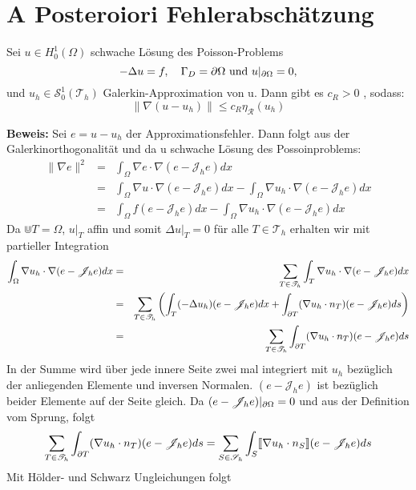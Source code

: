 \section{A Posteroiori Fehlerabschätzung}
\begin{theorem}
	Sei $u\in H^1_0(\Omega)$ schwache Lösung des Poisson-Problems \[-\Delta u = f ,\quad \Gamma_D = \partial \Omega \text{ und } u|_{\partial \Omega} = 0, \] und $u_h \in \mathscr{S}^1_0(\mathscr{T}_h)$ Galerkin-Approximation von u. Dann gibt es $c_R > 0$ , sodass:
	\[\|\nabla(u-u_h)\|\leq c_R\eta_\mathscr{R}(u_h)
	\]
\end{theorem}
\textbf{Beweis:}
Sei $e = u-u_h$ der Approximationsfehler. Dann folgt aus der Galerkinorthogonalität und da u schwache Lösung des Possoinproblems:
\begin{eqnarray*}
	\|\nabla e\|^2 &=& \int_{\Omega}\nabla e \cdot \nabla (e-\mathscr{J}_he)dx \\
	&=&\int_{\Omega} \nabla u \cdot \nabla (e-\mathscr{J}_he)dx -\int_{\Omega} \nabla u_h \cdot \nabla (e-\mathscr{J}_he)dx \\
	&=&\int_{\Omega} f (e-\mathscr{J}_he)dx -\int_{\Omega} \nabla u_h \cdot \nabla (e-\mathscr{J}_he)dx
\end{eqnarray*}
Da $\Cup T = \Omega$,  $u|_T$ affin und somit $\Delta u|_T=0$ für alle $T\in\mathscr{T}_h$ erhalten wir mit partieller Integration
\begin{eqnarray*}
	\int_{\Omega}\nabla u_h\cdot\nabla (e-\mathscr{J}_he) dx &=& \sum_{T\in\mathscr{T}_h} \int_{T} \nabla u_h \cdot \nabla (e-\mathscr{J}_he) dx \\
	&=& \sum_{T\in\mathscr{T}_h} \left(\int_{T} (-\Delta u_h) (e-\mathscr{J}_he) dx +\int_{\partial T} (\nabla u_h \cdot n_T) (e-\mathscr{J}_he) ds\right) \\
	&=&\sum_{T\in\mathscr{T}_h} \int_{\partial T} (\nabla u_h \cdot n_T) (e-\mathscr{J}_he) ds
\end{eqnarray*}
In der Summe wird über jede innere Seite zwei mal integriert mit $u_h$ bezüglich der anliegenden Elemente und inversen Normalen. $(e-\mathscr{J}_he)$ ist bezüglich beider Elemente auf der Seite gleich. Da $(e-\mathscr{J}_he)|_{\partial \Omega}=0$ und aus der Definition vom Sprung, folgt
\[
\sum_{T\in\mathscr{T}_h} \int_{\partial T} (\nabla u_h \cdot n_T) (e-\mathscr{J}_he) ds =
\sum_{S\in\mathscr{S}_h} \int_{S} \llbracket \nabla u_h \cdot n_S\rrbracket (e-\mathscr{J}_he) ds
\]
Mit Hölder- und Schwarz Ungleichungen folgt
